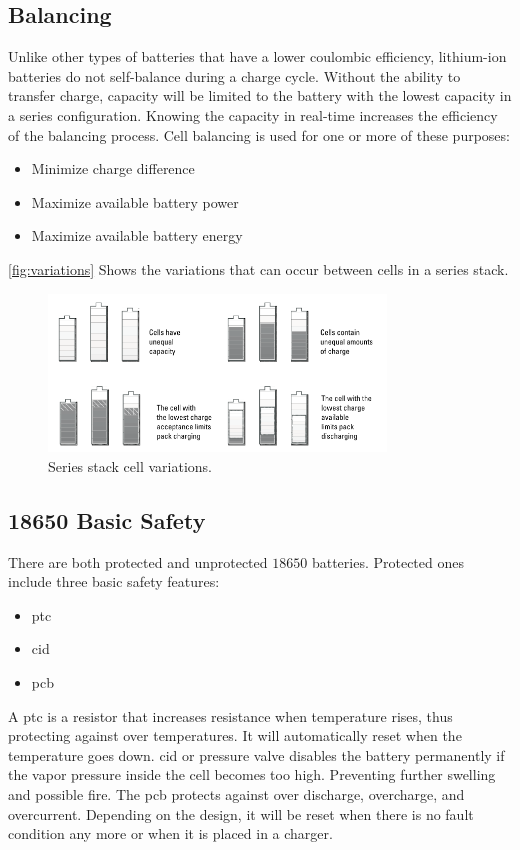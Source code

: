 \subsection{Balancing}
Unlike other types of batteries that have a lower coulombic efficiency, lithium-ion batteries do not self-balance during a charge cycle. Without the ability to transfer charge, capacity will be limited to the battery with the lowest capacity in a series configuration. Knowing the capacity in real-time increases the efficiency of the balancing process.
Cell balancing is used for one or more of these purposes\cite[p.183-185]{book}:
\begin{itemize}[noitemsep]
	\item Minimize charge difference
	\item Maximize available battery power
	\item Maximize available battery energy
\end{itemize}
\autoref{fig:variations} Shows the variations that can occur between cells in a series stack.
\begin{figure}[H]
	\centering
	\includegraphics[width=0.8\textwidth]{Figures/variations.png} 
	\caption{Series stack cell variations.}
	\label{fig:variations}
\end{figure}

\subsection{18650 Basic Safety}
There are both protected and unprotected $18650$ batteries. Protected ones include three basic safety features\cite{webpage}:
\begin{itemize}[noitemsep]
	\item \gls{ptc}
	\item \gls{cid}
	\item \gls{pcb}
\end{itemize}

A \gls{ptc} is a resistor that increases resistance when temperature rises, thus protecting against over temperatures. It will automatically reset when the temperature goes down.
\gls{cid} or pressure valve disables the battery permanently if the vapor pressure inside the cell becomes too high. Preventing further swelling and possible fire.
The \gls{pcb} protects against over discharge, overcharge, and overcurrent. Depending on the design, it will be reset when there is no fault condition any more or when it is placed in a charger.  

